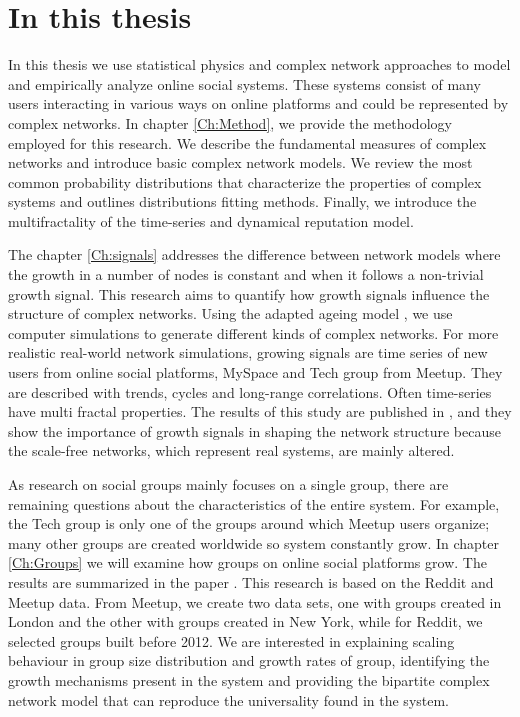 \section{In this thesis}

In this thesis we use statistical physics and complex network approaches to model and empirically analyze online social systems. These systems consist of many users interacting in various ways on online platforms and could be represented by complex networks. In chapter \ref{Ch:Method}, we provide the methodology employed for this research. We describe the fundamental measures of complex networks and introduce basic complex network models. We review the most common probability distributions that characterize the properties of complex systems and outlines distributions fitting methods. Finally, we introduce the multifractality of the time-series and dynamical reputation model. 

The chapter \ref{Ch:signals} addresses the difference between network models where the growth in a number of nodes is constant and when it follows a non-trivial growth signal. This research aims to quantify how growth signals influence the structure of complex networks. Using the adapted ageing model \cite{hajra2004}, we use computer simulations to generate different kinds of complex networks. For more realistic real-world network simulations, growing signals are time series of new users from online social platforms, MySpace and Tech group from Meetup. They are described with trends, cycles and long-range correlations. Often time-series have multi fractal properties. The results of this study are published in \cite{vranic2021growth}, and they show the importance of growth signals in shaping the network structure because the scale-free networks, which represent real systems, are mainly altered. 

As research on social groups mainly focuses on a single group, there are remaining questions about the characteristics of the entire system. 
For example, the Tech group is only one of the groups around which Meetup users organize; many other groups are created worldwide so system constantly grow. 
In chapter \ref{Ch:Groups} we will examine how groups on online social platforms grow. The results are summarized in the paper  \cite{vranic2022universal}. This research is based on the Reddit and Meetup data. From Meetup, we create two data sets, one with groups created in London and the other with groups created in New York, while for Reddit, we selected groups built before 2012. We are interested in explaining scaling behaviour in group size distribution and growth rates of group, identifying the growth mechanisms present in the system and providing the bipartite complex network model that can reproduce the universality found in the system.

